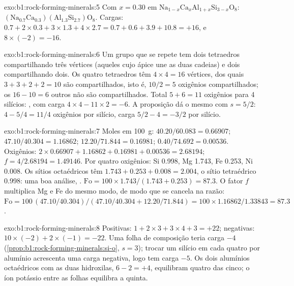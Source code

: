 \begin{solution}{exo:b1:rock-forming-minerals:5}
Com $x = 0.30$ em $\mathrm{Na}_{1-x}\mathrm{Ca}_x\mathrm{Al}_{1+x}\mathrm{Si}_{3-x}\mathrm{O}_8$:
$\mathrm{(Na_{0.7}Ca_{0.3})(Al_{1.3}Si_{2.7})O_8}$. Cargas:
$0.7 + 2\times0.3 + 3\times1.3 + 4\times2.7 = 0.7 + 0.6 + 3.9 + 10.8 = +16$,
e $8\times(-2) = -16$.
\end{solution}

\begin{solution}{exo:b1:rock-forming-minerals:6}
Um grupo que se repete tem dois tetraedros compartilhando três vértices (aqueles cujo ápice une as duas cadeias) e dois compartilhando dois. Os quatro tetraedros têm
$4\times4 = 16$ vértices, dos quais $3 + 3 + 2 + 2 = 10$ são compartilhados, isto é,
$10/2 = 5$ oxigênios compartilhados; os $16 - 10 = 6$ outros não são compartilhados. Total
$5 + 6 = 11$ oxigênios para 4 silícios: , com carga
$4\times4 - 11\times2 = -6$. A proposição dá o mesmo com
$s = 5/2$: $4 - 5/4 = 11/4$ oxigênios por silício, carga $5/2 - 4 = -3/2$ por
silício.
\end{solution}

\begin{solution}{exo:b1:rock-forming-minerals:7}
Moles em \qty{100}{g}:  $40.20/60.083 = 0.66907$; 
$47.10/40.304 = 1.16862$;  $12.20/71.844 = 0.16981$; 
$0.40/74.692 = 0.00536$. Oxigênios: $2\times0.66907 + 1.16862 + 0.16981 +
0.00536 = 2.68194$; $f = 4/2.68194 = 1.49146$. Por quatro oxigênios: Si
\num{0.998}, Mg \num{1.743}, Fe \num{0.253}, Ni \num{0.008}. Os
sítios octaédricos têm $1.743 + 0.253 + 0.008 = 2.004$, o sítio tetraédrico
\num{0.998}: uma boa análise, .
$\mathrm{Fo} = 100\times1.743/(1.743 + 0.253) = 87.3$. O fator $f$
multiplica Mg e Fe do mesmo modo, de modo que se cancela na razão:
$\mathrm{Fo} = 100\,(47.10/40.304)/(47.10/40.304 + 12.20/71.844) =
100\times1.16862/1.33843 = 87.3$.
\end{solution}

\begin{solution}{exo:b1:rock-forming-minerals:8}
Positivas: $1 + 2\times3 + 3\times4 + 3 = +22$; negativas:
$10\times(-2) + 2\times(-1) = -22$. Uma folha de composição  teria carga $-4$ (\cref{prop:b1:rock-forming-minerals:si-o}, $s = 3$); trocar um silício em cada quatro por alumínio acrescenta uma carga negativa, logo 
tem carga $-5$. Os dois alumínios octaédricos com as duas hidroxilas,
$6 - 2 = +4$, equilibram quatro das cinco; o íon potássio entre as folhas equilibra a quinta.
\end{solution}

